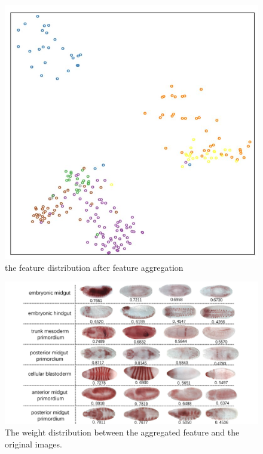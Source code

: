 \documentclass[10pt,twocolumn,letterpaper]{article}
\begin{document}
\begin{figure}[t]
\begin{center}
  \includegraphics[width=0.9\linewidth]{agg.JPG}
\end{center}
    \caption{the feature distribution after feature aggregation}
\label{fig:long}
\label{fig:onecol}
\end{figure}


\begin{figure}
\begin{center}
\includegraphics[width=0.8\linewidth]{flycompare.pdf}
\end{center}
   \caption{The weight distribution between the aggregated feature and the original images.}
\label{fig:short}
\end{figure}
\end{document}
